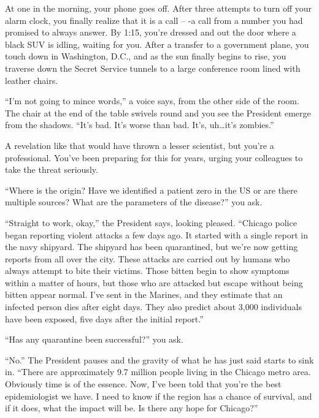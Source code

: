 \begin{emphbox}[]
	At one in the morning, your phone goes off.  After three attempts to 
	turn off your alarm clock, you finally realize that it is a call -- -a call from a 
	number you had promised to always answer.  By 1:15, you're dressed and out the door where 
	a black SUV is idling, waiting for you.  After a transfer to a government plane, you 
	touch down in Washington, D.C., and as the sun finally begins to rise, you traverse 
	down the Secret Service tunnels to a large conference room lined with leather chairs.

	``I'm not going to mince words,'' a voice says, from the other side of the room.  The 
	chair at the end of the table swivels round and you see the President emerge 
	from the shadows.  ``It's bad.  It's worse than bad.  It's, uh\ldots it's zombies.''

	A revelation like that would have thrown a lesser scientist, but you're a professional.  
	You've been preparing for this for years, urging your colleagues to take the threat seriously.  

	``Where is the origin?  Have we identified a patient zero in the US or are there multiple sources?  
	What are the parameters of the disease\mbox{?}'' you ask.

	``Straight to work, okay,'' the President says, looking pleased. ``Chicago police began reporting violent attacks a few days ago.  It started with a single report in the navy shipyard.  The shipyard has been quarantined, but we're now getting reports from all over the city. These attacks are carried out by humans who always attempt to bite their victims.  Those bitten begin to show symptoms within a matter of hours, but those who are attacked but escape without being bitten appear normal. I've sent in the Marines, and they estimate that an infected person dies after eight days. They also predict about 3,000 individuals have been exposed, five days 	after the initial report.''

	``Has any quarantine been successful\mbox{?}'' you ask.

	``No.''  The President pauses and the gravity of what he has just said starts to sink in.  
	``There are approximately 9.7 million people living in the Chicago metro area.  Obviously 
	time is of the essence.  Now, I've been told that you're the best epidemiologist we have.  
	I need to know if the region has a chance of survival, and if it does, what the impact will be.
	Is there any hope for Chicago?''
\end{emphbox}


